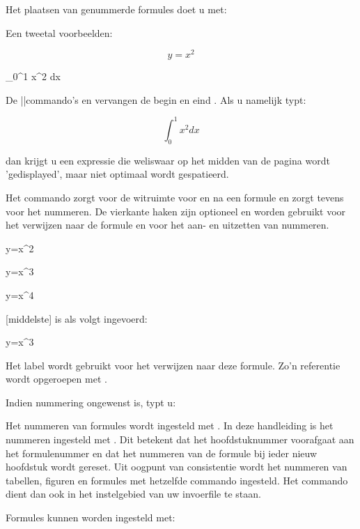
Het plaatsen van genummerde formules doet u met:


Een tweetal voorbeelden:

\startbuffer
{}
  $$y=x^2$$

\plaatsformule
  \startformule
    \int_0^1 x^2 dx
  \stopformule
\stopbuffer

\typebuffer

\haalbuffer

De \CONTEXT||commando's \type{\startformule} en
\type{\stopformule} vervangen de begin en eind \type{$$}.
Als u namelijk typt:

\startbuffer
$$
\int_0^1 x^2 dx
$$
\stopbuffer

\typebuffer

dan krijgt u een expressie die weliswaar op het midden van
de pagina wordt 'gedisplayed', maar niet optimaal wordt
gespatieerd.

\haalbuffer

Het commando \type{\plaatsformule[]} zorgt voor de witruimte
voor en na een formule en zorgt tevens voor het nummeren. De
vierkante haken zijn optioneel en worden gebruikt voor het
verwijzen naar de formule en voor het aan- en uitzetten van
nummeren.

\startbuffer
\plaatsformule[eerste]
\startformule
  y=x^2
\stopformule

\plaatsformule[middelste]
\startformule
  y=x^3
\stopformule

\plaatsformule[laatste]
\startformule
  y=x^4
\stopformule
\stopbuffer

\haalbuffer

[middelste] is als volgt ingevoerd:

\startbuffer
\plaatsformule[middelste]
  \startformule
     y=x^3
  \stopformule
\stopbuffer

\typebuffer

Het label \type{[middelste]} wordt gebruikt voor het
verwijzen naar deze formule. Zo'n referentie wordt
opgeroepen met .

Indien nummering ongewenst is, typt u:

\type{\plaatsformule[-]}

Het nummeren van formules wordt ingesteld met
\type{\stelnummerenin}. In deze handleiding is het nummeren
ingesteld met \type{\stelnummerenin[wijze=perhoofdstuk]}.
Dit betekent dat het hoofdstuknummer voorafgaat aan het
formulenummer en dat het nummeren van de formule bij ieder
nieuw hoofdstuk wordt gereset. Uit oogpunt van consistentie
wordt het nummeren van tabellen, figuren en formules met
hetzelfde commando ingesteld. Het commando
\type{\stelnummerenin} dient dan ook in het instelgebied van
uw invoerfile te staan.

Formules kunnen worden ingesteld met:


\stoponderdeel
